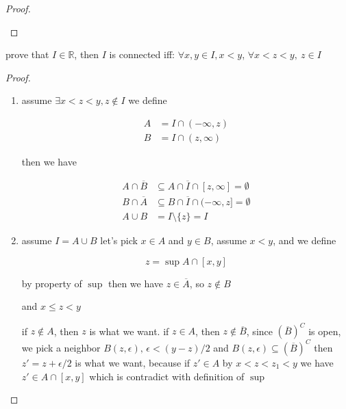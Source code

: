 \begin{proof}
\begin{enumerate}
   \end{enumerate} 
\end{proof}

\begin{exercise}
    prove that $I \in \mathbb{R}$, then $I$ is connected iff: $\forall x,y \in I, x <y$, $\forall x < z < y,\: z \in I$     
\end{exercise}

\begin{proof}
    \begin{enumerate}
        \item assume $\exists x < z < y, z \notin I$ we define

        \begin{align*}
            A &= I \cap (-\infty, z) \\ 
            B &= I \cap (z, \infty)
        \end{align*}

        then we have

        \begin{align*}
            A \cap \overline{B} & \subseteq A \cap \overline{I} \cap [z, \infty] = \emptyset \\
            B \cap \overline{A} & \subseteq B \cap \overline{I} \cap (-\infty,z] = \emptyset \\
            A \cup B &= I \setminus \{ z \} = I
        \end{align*}

        \item assume $I = A \cup B$
        let's pick $x \in A$ and $y \in B$, assume $x < y$, and we define

        \[
            z = \sup A \cap [x,y]
        \]

        by property of $\sup$ then we have $z \in \overline{A}$, so $z \notin B$

        and $x \le z < y$

        if $z \notin A$, then $z$ is what we want. if $z \in A$, then $z \notin \overline{B}$, since $(\overline{B})^C$ is open, 
        we pick a neighbor $B(z, \epsilon),\, \epsilon < (y -z) / 2$ and $B(z, \epsilon) \subseteq (\overline{B})^C$
        then $z' = z + \epsilon / 2$ is what we want, because if $z' \in A$ by $x < z < z_1 < y$ we have $z' \in A \cap [x,y]$ which 
        is contradict with definition of $\sup$


    \end{enumerate}
\end{proof}

















